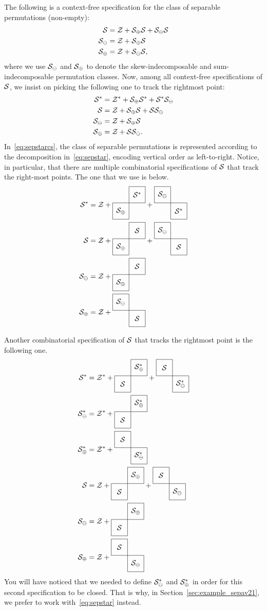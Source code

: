 \documentclass[12pt, a4paper, twoside]{report}
\begin{document}
\begin{example}
  \label{ex:separable_combspec}
  The following is a context-free specification for the class of separable permutations (non-empty):
  \begin{align*}
    \S &= \Z + \S_{\oplus}\S + \S_{\ominus}\S\\
    \S_{\ominus} &= \Z + \S_\oplus\S\\
    \S_\oplus &= \Z + \S_\ominus\S,
  \end{align*}
  where we use $\S_\ominus$ and $\S_\oplus$ to denote the skew-indecomposable and sum-indecomposable permutation classes. Now, among all context-free specifications of $\S$, we insist on picking the following one to track the rightmost point:
  \begin{align}
    \begin{aligned}
    \S^* &= \Z^* + \S_{\oplus}\S^* + \S^*\S_{\ominus}\\
    \S &= \Z + \S_{\oplus}\S + \S\S_{\ominus}\\
    \S_{\ominus} &= \Z + \S_\oplus\S\\
    \S_\oplus &= \Z + \S\S_\ominus.
    \label{eq:sepstarcs}
  \end{aligned}
  \end{align}
  In~\eqref{eq:sepstarcs}, the class of separable permutations is represented according to the decomposition in~\eqref{eq:sepstar}, encoding vertical order as left-to-right. Notice, in particular, that there are multiple combinatorial specifications of $\S$ that track the right-most points. The one that we use is below.
  \begin{align}
    \begin{aligned}
      \S^* &= \Z + \cplusc{\S_\oplus}{\S^*} + \cminusc{\S^*}{\S_\ominus}\\
      \S &= \Z + \cplusc{\S_\oplus}{\S} + \cminusc{\S}{\S_\ominus}\\
      \S_\ominus &= \Z + \cplusc{\S_\oplus}{\S}\\
      \S_\oplus &= \Z + \cminusc{\S}{\S_\ominus}
    \end{aligned}
                  \label{eq:sepstar}
  \end{align}

Another combinatorial specification of $\S$ that tracks the rightmost point is the following one.
  \begin{align*}
    \S^* &= \Z^* + \cplusc{\S}{\S_\oplus^*} + \cminusc{\S_\ominus^*}{\S}\\
    \S_\ominus^* &= \Z^* + \cplusc{\S}{\S_\oplus^*}\\
    \S_\oplus^* &= \Z^* + \cminusc{\S_\ominus^*}{\S}\\
    \S &= \Z + \cplusc{\S}{\S_\oplus} + \cminusc{\S_\ominus}{\S}\\
    \S_\ominus &= \Z + \cplusc{\S}{\S_\oplus}\\
    \S_\oplus &= \Z + \cminusc{\S_\ominus}{\S}
  \end{align*}
  You will have noticed that we needed to define $\S_\ominus^*$ and $\S_\oplus^*$ in order for this second specification to be closed. That is why, in Section~\ref{sec:example_sepav21}, we prefer to work with~\eqref{eq:sepstar} instead.
\end{example}
\end{document}
